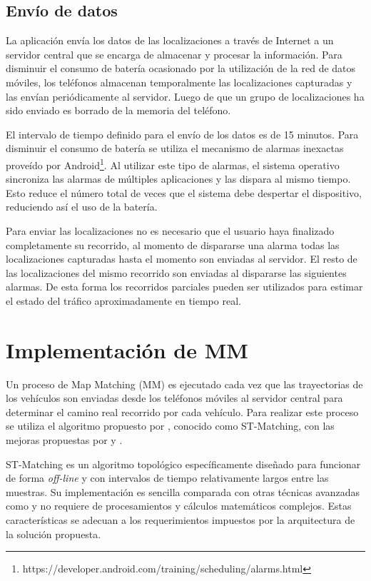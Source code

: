 \subsection{Envío de datos}

La aplicación envía los datos de las localizaciones a través de Internet a un servidor central que se encarga de almacenar y procesar la información. Para disminuir el consumo de batería ocasionado por la utilización de la red de datos móviles, los teléfonos almacenan temporalmente las localizaciones capturadas y las envían periódicamente al servidor. Luego de que un grupo de localizaciones ha sido enviado es borrado de la memoria del teléfono.

El intervalo de tiempo definido para el envío de los datos es de 15 minutos. Para disminuir el consumo de batería se utiliza el mecanismo de alarmas inexactas proveído por Android\footnote{https://developer.android.com/training/scheduling/alarms.html}. Al utilizar este tipo de alarmas, el sistema operativo sincroniza las alarmas de múltiples aplicaciones y las dispara al mismo tiempo. Esto reduce el número total de veces que el sistema debe despertar el dispositivo, reduciendo así el uso de la batería.

Para enviar las localizaciones no es necesario que el usuario haya finalizado completamente su recorrido, al momento de dispararse una alarma todas las localizaciones capturadas hasta el momento son enviadas al servidor. El resto de las localizaciones del mismo recorrido son enviadas al dispararse las siguientes alarmas. De esta forma los recorridos parciales pueden ser utilizados para estimar el estado del tráfico aproximadamente en tiempo real.

\section{Implementación de MM}
\label{implementacion_mm}

Un proceso de Map Matching (MM) es ejecutado cada vez que las trayectorias de los vehículos son enviadas desde los teléfonos móviles al servidor central para determinar el camino real recorrido por cada vehículo. Para realizar este proceso se utiliza el algoritmo propuesto por \cite{lou2009map}, conocido como ST-Matching, con las mejoras propuestas por \cite{budigm2012algorithm} y \cite{sakic2012map}. 

ST-Matching es un algoritmo topológico específicamente diseñado para funcionar de forma \emph{off-line} y con intervalos de tiempo relativamente largos entre las muestras. Su implementación es sencilla comparada con otras técnicas avanzadas como \cite{quddus2006high, newson2009hidden} y no requiere de procesamientos y cálculos matemáticos complejos. Estas características se adecuan a los requerimientos impuestos por la arquitectura de la solución propuesta. 

